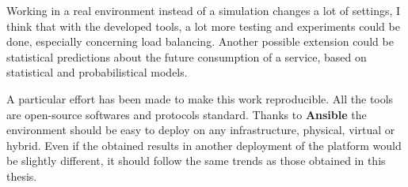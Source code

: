 Working in a real environment instead of a simulation changes a lot of settings,
I think that with the developed tools, a lot more testing and experiments
could be done, especially concerning load balancing. Another possible extension
could be statistical predictions about the future consumption of a service,
based on statistical and probabilistical models. 
\vspace{1em}

A particular effort has been made to make this work reproducible. All the
tools are open-source softwares and protocols standard.  Thanks to
\textbf{Ansible} the environment should be easy to deploy on any
infrastructure, physical, virtual or hybrid.  Even if the obtained results in
another deployment of the platform would be slightly different, it should
follow the same trends as those obtained in this thesis.
